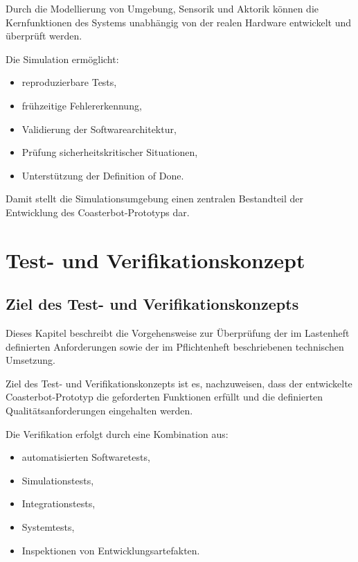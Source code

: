 \documentclass[
  a4paper,
  12pt,
  DIV=12,        %
  parskip=half,  %
  headings=small %
]{scrartcl}
\theoremstyle{definition}
\providecommand{\tightlist}{%
  \setlength{\itemsep}{0pt}\setlength{\parskip}{0pt}}
\theoremstyle{definition}
\begin{document}
Durch die Modellierung von Umgebung, Sensorik und Aktorik können die
Kernfunktionen des Systems unabhängig von der realen Hardware entwickelt
und überprüft werden.

Die Simulation ermöglicht:

\begin{itemize}
\tightlist
\item
  reproduzierbare Tests,
\item
  frühzeitige Fehlererkennung,
\item
  Validierung der Softwarearchitektur,
\item
  Prüfung sicherheitskritischer Situationen,
\item
  Unterstützung der Definition of Done.
\end{itemize}

Damit stellt die Simulationsumgebung einen zentralen Bestandteil der
Entwicklung des Coasterbot-Prototyps dar.

\section{Test- und
Verifikationskonzept}\label{test--und-verifikationskonzept}

\subsection{Ziel des Test- und
Verifikationskonzepts}\label{ziel-des-test--und-verifikationskonzepts}

Dieses Kapitel beschreibt die Vorgehensweise zur Überprüfung der im
Lastenheft definierten Anforderungen sowie der im Pflichtenheft
beschriebenen technischen Umsetzung.

Ziel des Test- und Verifikationskonzepts ist es, nachzuweisen, dass der
entwickelte Coasterbot-Prototyp die geforderten Funktionen erfüllt und
die definierten Qualitätsanforderungen eingehalten werden.

Die Verifikation erfolgt durch eine Kombination aus:

\begin{itemize}
\tightlist
\item
  automatisierten Softwaretests,
\item
  Simulationstests,
\item
  Integrationstests,
\item
  Systemtests,
\item
  Inspektionen von Entwicklungsartefakten.
\end{itemize}
\end{document}
